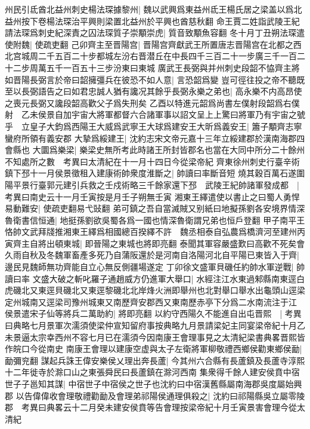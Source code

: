 州民引氐酋北益州刺史楊法琛據黎州|{
	魏以武興爲東益州氐王楊氏居之梁盖以爲北益州按下卷楊法琛治平興則梁置北益州於平興也酋慈秋翻}
命王賈二姓詣武陵王紀請法琛爲刺史紀深責之囚法琛質子崇顒崇虎|{
	質音致顒魚容翻}
冬十月丁丑朔法琛遣使附魏|{
	使疏吏翻}
己卯齊主至晋陽宫|{
	晋陽宫齊獻武王所置唐志晋陽宫在北都之西北宫城周二千五百二十步都城左汾右晋潜丘在中長四千三百二十一步廣三千一百二十二步周萬五千一百五十三步汾東曰東城}
廣武王長弼與并州刺史段韶不恊齊主將如晋陽長弼言於帝曰韶擁彊兵在彼恐不如人意|{
	言恐韶爲變}
豈可徑往投之帝不聽既至以長弼語告之曰如君忠誠人猶有讒况其餘乎長弼永樂之弟也|{
	高永樂不内高昂使之喪元長弼又讒段韶高歡父子爲失刑矣}
乙酉以特進元韶爲尚書左僕射段韶爲右僕射　乙未侯景自加宇宙大將軍都督六合諸軍事以詔文呈上上驚曰將軍乃有宇宙之號乎　立皇子大鈞爲西陽王大威爲武寧王大球爲建安王大昕爲義安王|{
	簫子顒齊志寧蠻府所領有義安郡}
大摯爲綏建王|{
	沈約志宋文帝元嘉十三年立綏建郡於漢南海郡四會縣也}
大圜爲樂梁|{
	樂梁史無所考此時諸王所封皆郡名也當在大同中所分二十餘州不知處所之數　考異曰太清紀在十一月十四日今從梁帝紀}
齊東徐州刺史行臺辛術鎮下邳十一月侯景徵租入建康術帥衆度淮斷之|{
	帥讀曰率斷音短}
燒其穀百萬石遂圍陽平景行臺郭元建引兵救之壬戍術略三千餘家還下邳　武陵王紀帥諸軍發成都　|{
	考異曰南史云十一月壬寅按是月壬子朔無壬寅}
湘東王繹遣使以書止之曰蜀人勇悍易動難安|{
	使疏吏翻易弋䜴翻}
弟可鎮之吾自當滅賊又别紙曰地擬孫劉各安境界情深魯衛書信恒通|{
	地挺孫劉欲吳蜀各爲一國也情深魯衛謂兄弟也恒戶登翻}
甲子南平王恪帥文武拜牋推湘東王繹爲相國總百揆繹不許　魏丞相泰自弘農爲橋濟河至建州丙寅齊主自將出頓東城|{
	即晉陽之東城也將即亮翻}
泰聞其軍容嚴盛歎曰高歡不死矣會久雨自秋及冬魏軍畜產多死乃自蒲阪還於是河南自洛陽河北自平陽已東皆入于齊|{
	邊民見魏師無功齊能自立心無反側疆場遂定}
丁卯徐文盛軍貝磯任約帥水軍逆戰|{
	帥讀曰率}
文盛大破之斬叱羅子通趙威方仍進軍大舉口|{
	水經注江水東過邾縣南東逕白虎磯北又東逕貝磯北又東逕黎磯北北岸烽火洲即舉州也北對舉口舉水出龜頭山逕梁定州城南又逕梁司豫州城東又南歷齊安郡西又東南歷赤亭下分爲二水南流注于江}
侯景遣宋子仙等將兵二萬助約|{
	將即亮翻}
以約守西陽久不能進自出屯晋熙　|{
	考異曰典略七月景軍次濡須使梁仲宣知留府事按典略九月景請梁妃主同宴梁帝紀十月乙未景逼太宗幸西州不容七月已在濡須今因南康王會理事見之太清紀梁書典畧晋熙皆作皖口今從南史}
南康王會理以建康空虚與太子左衛將軍柳敬禮西鄉侯勸東鄉侯勔|{
	勔彌兖翻}
謀起兵誅王偉安樂侯乂理出奔長蘆|{
	今其州六合縣有長蘆鎮及長蘆寺淳熙十二年徙寺於滁口山之東張舜民曰長蘆鎮在滁河西南}
集衆得千餘人建安侯賁中宿世子子邕知其謀|{
	中宿世子中宿侯之世子也沈約曰中宿漢舊縣屬南海郡吳度屬始興郡}
以告偉偉收會理敬禮勸勔及會理弟祁陽侯通理俱殺之|{
	沈約曰祁陽縣吳立屬零陵郡　考異曰典畧云十二月癸未建安侯賁等告會理按梁帝紀十月壬寅景害會理今從太清紀}

